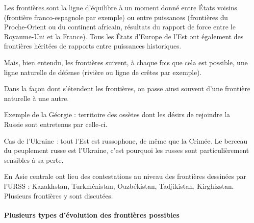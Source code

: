 \documentclass[a4paper,10pt]{article}
\begin{document}
		Les frontières sont la ligne d'équilibre à un moment donné entre États voisins (frontière franco-espagnole par exemple) ou entre puissances (frontières du Proche-Orient ou du continent africain, résultats du rapport de force entre le Royaume-Uni et la France).
		Tous les États d'Europe de l'Est ont également des frontières héritées de rapports entre puissances historiques.

		Mais, bien entendu, les frontières suivent, à chaque fois que cela est possible, une ligne naturelle de défense (rivière ou ligne de crêtes par exemple).

		Dans la façon dont s'étendent les frontières, on passe ainsi souvent d'une frontière naturelle à une autre.

		Exemple de la Géorgie : territoire des ossètes dont les désirs de rejoindre la Russie sont entretenus par celle-ci.

		Cas de l'Ukraine : tout l'Est est russophone, de même que la Crimée.
		Le berceau du peuplement russe est l'Ukraine, c'est pourquoi les russes sont particulièrement sensibles à sa perte.

		En Asie centrale ont lieu des contestations au niveau des frontières dessinées par l'URSS : Kazakhstan, Turkménistan, Ouzbékistan, Tadjikistan, Kirghizstan.
		Plusieurs frontières y sont discutées.

		\paragraph{Plusieurs types d'évolution des frontières possibles}
\end{document}
